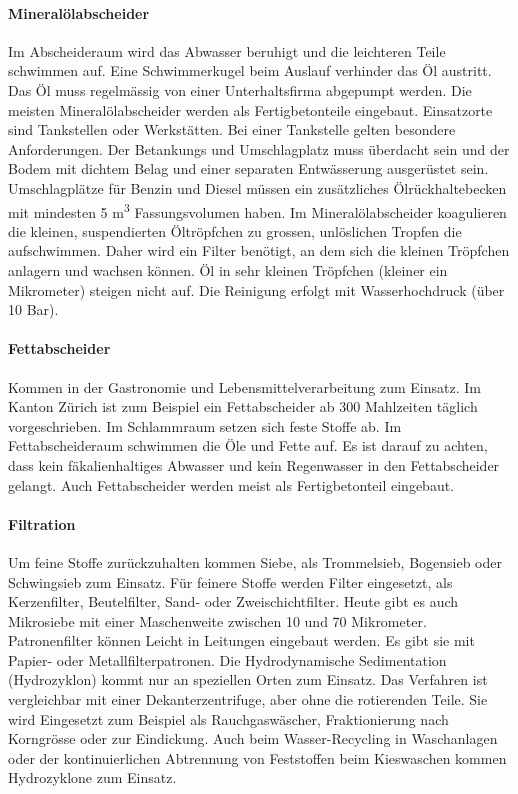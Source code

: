 \documentclass[9pt, openright=false]{scrartcl}
\begin{document}
\paragraph{Mineralölabscheider} Im Abscheideraum wird das Abwasser beruhigt und die leichteren Teile schwimmen auf. Eine Schwimmerkugel beim Auslauf verhinder das Öl austritt. Das Öl muss regelmässig von einer Unterhaltsfirma abgepumpt werden. Die meisten Mineralölabscheider werden als Fertigbetonteile eingebaut. Einsatzorte sind Tankstellen oder Werkstätten. Bei einer Tankstelle gelten besondere Anforderungen. Der Betankungs und Umschlagplatz muss überdacht sein und der Bodem mit dichtem Belag und einer separaten Entwässerung ausgerüstet sein. Umschlagplätze für Benzin und Diesel müssen ein zusätzliches Ölrückhaltebecken mit mindesten 5 m\textsuperscript{3} Fassungsvolumen haben. Im Mineralölabscheider koagulieren die kleinen, suspendierten Öltröpfchen zu grossen, unlöslichen Tropfen die aufschwimmen. Daher wird ein Filter benötigt, an dem sich die kleinen Tröpfchen anlagern und wachsen können. Öl in sehr kleinen Tröpfchen (kleiner ein Mikrometer) steigen nicht auf. Die Reinigung erfolgt mit Wasserhochdruck (über 10 Bar).
\paragraph{Fettabscheider} Kommen in der Gastronomie und Lebensmittelverarbeitung zum Einsatz. Im Kanton Zürich ist zum Beispiel ein Fettabscheider ab 300 Mahlzeiten täglich vorgeschrieben. Im Schlammraum setzen sich feste Stoffe ab. Im Fettabscheideraum schwimmen die Öle und Fette auf. Es ist darauf zu achten, dass kein fäkalienhaltiges Abwasser und kein Regenwasser in den Fettabscheider gelangt. Auch Fettabscheider werden meist als Fertigbetonteil eingebaut. 
\paragraph{Filtration} Um feine Stoffe zurückzuhalten kommen Siebe, als Trommelsieb, Bogensieb oder Schwingsieb zum Einsatz. Für feinere Stoffe werden Filter eingesetzt, als Kerzenfilter, Beutelfilter, Sand- oder Zweischichtfilter. Heute gibt es auch Mikrosiebe mit einer Maschenweite zwischen 10 und 70 Mikrometer. Patronenfilter können Leicht in Leitungen eingebaut werden. Es gibt sie mit Papier- oder Metallfilterpatronen. Die Hydrodynamische Sedimentation (Hydrozyklon) kommt nur an speziellen Orten zum Einsatz. Das Verfahren ist vergleichbar mit einer Dekanterzentrifuge, aber ohne die rotierenden Teile. Sie wird Eingesetzt zum Beispiel als Rauchgaswäscher, Fraktionierung nach Korngrösse oder zur Eindickung. Auch beim Wasser-Recycling in Waschanlagen oder der kontinuierlichen Abtrennung von Feststoffen beim Kieswaschen kommen Hydrozyklone zum Einsatz.
\end{document}
